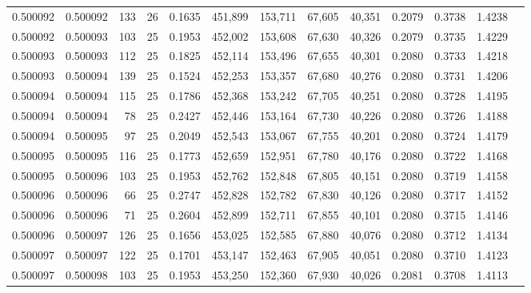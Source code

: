 \begin{tabular}{rrrrrrrrrrrrr}
0.500092 & 0.500092 & 133 &  26 &                                     0.1635 & 451,899 & 153,711 &  67,605 &  40,351 & 0.2079 & 0.3738 & 1.4238 \\
0.500092 & 0.500093 & 103 &  25 &                                     0.1953 & 452,002 & 153,608 &  67,630 &  40,326 & 0.2079 & 0.3735 & 1.4229 \\
0.500093 & 0.500093 & 112 &  25 &                                     0.1825 & 452,114 & 153,496 &  67,655 &  40,301 & 0.2080 & 0.3733 & 1.4218 \\
0.500093 & 0.500094 & 139 &  25 &                                     0.1524 & 452,253 & 153,357 &  67,680 &  40,276 & 0.2080 & 0.3731 & 1.4206 \\
0.500094 & 0.500094 & 115 &  25 &                                     0.1786 & 452,368 & 153,242 &  67,705 &  40,251 & 0.2080 & 0.3728 & 1.4195 \\
0.500094 & 0.500094 &  78 &  25 &                                     0.2427 & 452,446 & 153,164 &  67,730 &  40,226 & 0.2080 & 0.3726 & 1.4188 \\
0.500094 & 0.500095 &  97 &  25 &                                     0.2049 & 452,543 & 153,067 &  67,755 &  40,201 & 0.2080 & 0.3724 & 1.4179 \\
0.500095 & 0.500095 & 116 &  25 &                                     0.1773 & 452,659 & 152,951 &  67,780 &  40,176 & 0.2080 & 0.3722 & 1.4168 \\
0.500095 & 0.500096 & 103 &  25 &                                     0.1953 & 452,762 & 152,848 &  67,805 &  40,151 & 0.2080 & 0.3719 & 1.4158 \\
0.500096 & 0.500096 &  66 &  25 &                                     0.2747 & 452,828 & 152,782 &  67,830 &  40,126 & 0.2080 & 0.3717 & 1.4152 \\
0.500096 & 0.500096 &  71 &  25 &                                     0.2604 & 452,899 & 152,711 &  67,855 &  40,101 & 0.2080 & 0.3715 & 1.4146 \\
0.500096 & 0.500097 & 126 &  25 &                                     0.1656 & 453,025 & 152,585 &  67,880 &  40,076 & 0.2080 & 0.3712 & 1.4134 \\
0.500097 & 0.500097 & 122 &  25 &                                     0.1701 & 453,147 & 152,463 &  67,905 &  40,051 & 0.2080 & 0.3710 & 1.4123 \\
0.500097 & 0.500098 & 103 &  25 &                                     0.1953 & 453,250 & 152,360 &  67,930 &  40,026 & 0.2081 & 0.3708 & 1.4113 \\

\end{tabular}
